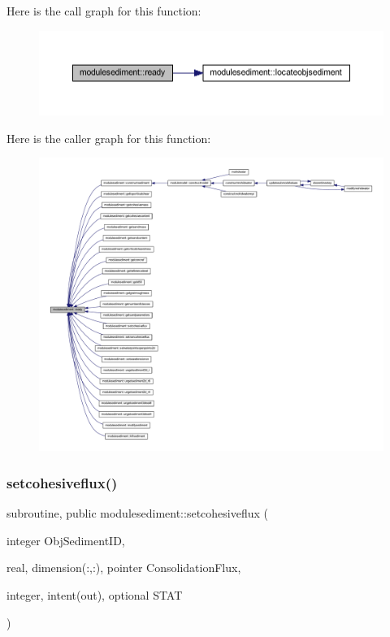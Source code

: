 Here is the call graph for this function\+:\nopagebreak
\begin{figure}[H]
\begin{center}
\leavevmode
\includegraphics[width=350pt]{namespacemodulesediment_a2427e7af36c908526797cc897f1dca07_cgraph}
\end{center}
\end{figure}
Here is the caller graph for this function\+:\nopagebreak
\begin{figure}[H]
\begin{center}
\leavevmode
\includegraphics[width=350pt]{namespacemodulesediment_a2427e7af36c908526797cc897f1dca07_icgraph}
\end{center}
\end{figure}
\mbox{\label{namespacemodulesediment_ab6753fbc97e7e46e60797defc442a36e}} 
\subsubsection{\texorpdfstring{setcohesiveflux()}{setcohesiveflux()}}
{\footnotesize\ttfamily subroutine, public modulesediment\+::setcohesiveflux (\begin{DoxyParamCaption}\item[{integer}]{Obj\+Sediment\+ID,  }\item[{real, dimension(\+:,\+:), pointer}]{Consolidation\+Flux,  }\item[{integer, intent(out), optional}]{S\+T\+AT }\end{DoxyParamCaption})}

